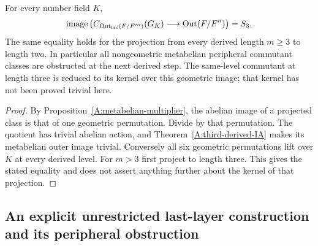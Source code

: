 \begin{corollary}
\label{A:third-derived-projection}
For every number field $K$,
\[
 \operatorname{image}\left(
 C_{\operatorname{Out}_{\rm lac}(F/F''')}(G_K)
          \longrightarrow\operatorname{Out}(F/F'')\right)=S_3.
\]
The same equality holds for the projection from every
derived length $m\ge3$ to length two. In particular
all nongeometric metabelian peripheral commutant classes
are obstructed at the next derived step.
The same-level commutant at length three is reduced
to its kernel over this geometric image; that kernel
has not been proved trivial here.
\end{corollary}
\begin{proof}
By Proposition~\ref{A:metabelian-multiplier}, the
abelian image of a projected class is that of one
geometric permutation. Divide by that permutation.
The quotient has trivial abelian action, and
Theorem~\ref{A:third-derived-IA} makes its metabelian
outer image trivial. Conversely all six geometric
permutations lift over $K$ at every derived level.
For $m>3$ first project to length three. This gives
the stated equality and does not assert anything
further about the kernel of that projection.
\end{proof}

\subsection{An explicit unrestricted last-layer construction and its peripheral obstruction}

